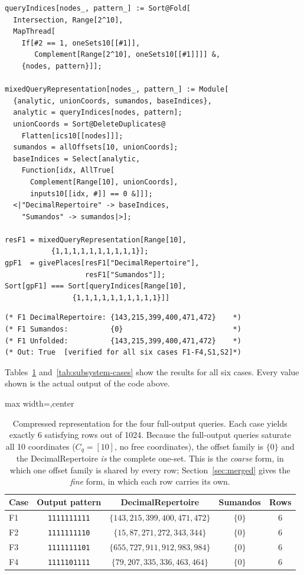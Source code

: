 \documentclass[11pt]{article}
\begin{document}
\begin{lstlisting}[style=MathematicaStyle,caption={Mixed-query evaluation and corroboration.}]
queryIndices[nodes_, pattern_] := Sort@Fold[
  Intersection, Range[2^10],
  MapThread[
    If[#2 == 1, oneSets10[[#1]],
       Complement[Range[2^10], oneSets10[[#1]]]] &,
    {nodes, pattern}]];

mixedQueryRepresentation[nodes_, pattern_] := Module[
  {analytic, unionCoords, sumandos, baseIndices},
  analytic = queryIndices[nodes, pattern];
  unionCoords = Sort@DeleteDuplicates@
    Flatten[ics10[[nodes]]];
  sumandos = allOffsets[10, unionCoords];
  baseIndices = Select[analytic,
    Function[idx, AllTrue[
      Complement[Range[10], unionCoords],
      inputs10[[idx, #]] == 0 &]]];
  <|"DecimalRepertoire" -> baseIndices,
    "Sumandos" -> sumandos|>];

resF1 = mixedQueryRepresentation[Range[10],
           {1,1,1,1,1,1,1,1,1,1}];
gpF1  = givePlaces[resF1["DecimalRepertoire"],
                   resF1["Sumandos"]];
Sort[gpF1] === Sort[queryIndices[Range[10],
                {1,1,1,1,1,1,1,1,1,1}]]
\end{lstlisting}
\begin{lstlisting}[style=MathematicaOutput]
(* F1 DecimalRepertoire: {143,215,399,400,471,472}    *)
(* F1 Sumandos:          {0}                          *)
(* F1 Unfolded:          {143,215,399,400,471,472}    *)
(* Out: True  [verified for all six cases F1-F4,S1,S2]*)
\end{lstlisting}

Tables~\ref{tab:full-cases} and~\ref{tab:subsystem-cases} show the
results for all six cases.  Every value shown is the actual output of
the code above.

\begin{table}[h]
\centering
\small
\setlength{\tabcolsep}{3pt}
\begin{adjustbox}{max width=\textwidth,center}
\begin{tabular}{@{}lcccc@{}}
\toprule
Case & Output pattern & DecimalRepertoire & Sumandos & Rows \\
\midrule
F1 & \texttt{1111111111} & $\{143,215,399,400,471,472\}$ & $\{0\}$ & 6 \\
F2 & \texttt{1111111110} & $\{15,87,271,272,343,344\}$ & $\{0\}$ & 6 \\
F3 & \texttt{1111111101} & $\{655,727,911,912,983,984\}$ & $\{0\}$ & 6 \\
F4 & \texttt{1111101111} & $\{79,207,335,336,463,464\}$ & $\{0\}$ & 6 \\
\bottomrule
\end{tabular}
\end{adjustbox}
\caption{Compressed representation for the four full-output queries.
Each case yields exactly 6 satisfying rows out of 1024.  Because the
full-output queries saturate all 10 coordinates ($C_q = [10]$, no free
coordinates), the offset family is $\{0\}$ and the DecimalRepertoire
\emph{is} the complete one-set.  This is the \emph{coarse} form, in which one
offset family is shared by every row; Section~\ref{sec:merged} gives the
\emph{fine} form, in which each row carries its own.}
\label{tab:full-cases}
\end{table}
\end{document}
